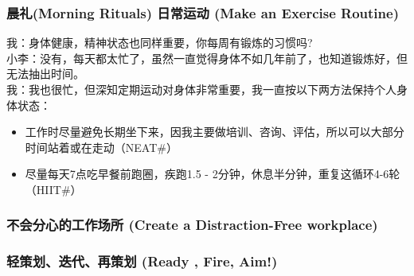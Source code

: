 \hypertarget{ux6839ux56e0ux5206ux6790ux8befux89e3ux6848ux4f8b}{%
\subsubsection{晨礼(Morning Rituals) 日常运动 (Make an Exercise Routine)}\label{ux6839ux56e0ux5206ux6790ux8befux89e3ux6848ux4f8b}}



我：身体健康，精神状态也同样重要，你每周有锻炼的习惯吗?\\
小李：没有，每天都太忙了，虽然一直觉得身体不如几年前了，也知道锻炼好，但无法抽出时间。\\
我：我也很忙，但深知定期运动对身体非常重要，我一直按以下两方法保持个人身体状态：

\begin{itemize}
\tightlist
\item
  工作时尽量避免长期坐下来，因我主要做培训、咨询、评估，所以可以大部分时间站着或在走动（NEAT\#）
\item
  尽量每天7点吃早餐前跑圈，疾跑1.5 -
  2分钟，休息半分钟，重复这循环4-6轮（HIIT\#）
\end{itemize}

\hypertarget{ux6839ux56e0ux5206ux6790ux8befux89e3ux6848ux4f8b}{%
\subsubsection{不会分心的工作场所 (Create a Distraction-Free workplace)}\label{ux6839ux56e0ux5206ux6790ux8befux89e3ux6848ux4f8b}}

\hypertarget{ux6839ux56e0ux5206ux6790ux8befux89e3ux6848ux4f8b}{%
\subsubsection{轻策划、迭代、再策划 (Ready , Fire, Aim!)}\label{ux6839ux56e0ux5206ux6790ux8befux89e3ux6848ux4f8b}}

